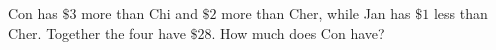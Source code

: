 Con has $\$3$ more than Chi and $\$2$ more than Cher, while Jan has $\$1$ less than Cher. Together the four have $\$28$. How much does Con have?

